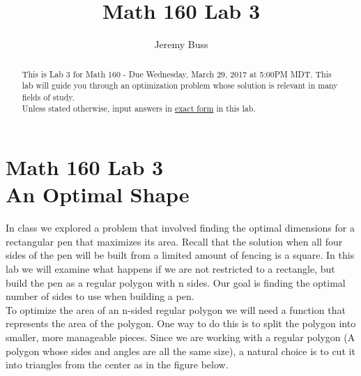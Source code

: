 \documentclass[handout,nooutcomes]{ximera}
\title{Math 160 Lab 3}
\author{Jeremy Buss} %
\begin{document}
\section{Math 160 Lab 3 \\ An Optimal Shape}

\begin{abstract}
This is Lab 3 for Math 160 - Due Wednesday, March 29, 2017 at 5:00PM MDT.
This lab will guide you through an optimization problem whose solution is relevant in many fields of study.\\

Unless stated otherwise, input answers in \underline{exact form} in this lab.
\end{abstract}

\maketitle

\hspace{2cm}In class we explored a problem that involved finding the optimal dimensions for a rectangular pen that maximizes its area. Recall that the solution when all four sides of the pen will be built from a limited amount of fencing is a square. In this lab we will examine what happens if we are not restricted to a rectangle, but build the pen as a regular polygon with n sides. Our goal is finding the optimal number of sides to use when building a pen.\\

\medskip
\hspace{2cm}To optimize the area of an n-sided regular polygon we will need a function that represents the area of the polygon. One way to do this is to split the polygon into smaller, more manageable pieces. Since we are working with a regular polygon (A polygon whose sides and angles are all the same size), a natural choice is to cut it into triangles from the center as in the figure below.
\end{document}
